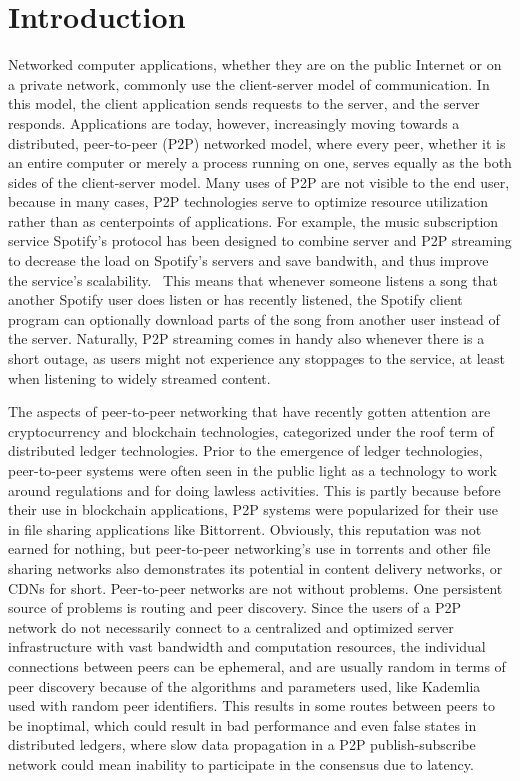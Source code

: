 \chapter{Introduction}
\label{Introduction}

Networked computer applications, whether they are on the public Internet or on a private network, commonly use the client-server model of communication. In this model, the client application sends requests to the server, and the server responds. Applications are today, however, increasingly moving towards a distributed, peer-to-peer (P2P) networked model, where every peer, whether it is an entire computer or merely a process running on one, serves equally as the both sides of the client-server model. Many uses of P2P are not visible to the end user, because in many cases, P2P technologies serve to optimize resource utilization rather than as centerpoints of applications. For example, the music subscription service Spotify's protocol has been designed to combine server and P2P streaming to decrease the load on Spotify's servers and save bandwith, and thus improve the service's scalability.~\cite{Kreitz_undated-yp} This means that whenever someone listens a song that another Spotify user does listen or has recently listened, the Spotify client program can optionally download parts of the song from another user instead of the server. Naturally, P2P streaming comes in handy also whenever there is a short outage, as users might not experience any stoppages to the service, at least when listening to widely streamed content.

The aspects of peer-to-peer networking that have recently gotten attention are cryptocurrency and blockchain technologies, categorized under the roof term of distributed ledger technologies. Prior to the emergence of ledger technologies, peer-to-peer systems were often seen in the public light as a technology to work around regulations and for doing lawless activities. This is partly because before their use in blockchain applications, P2P systems were popularized for their use in file sharing applications like Bittorrent. Obviously, this reputation was not earned for nothing, but peer-to-peer networking's use in torrents and other file sharing networks also demonstrates its potential in content delivery networks, or CDNs for short. Peer-to-peer networks are not without problems. One persistent source of problems is routing and peer discovery. Since the users of a P2P network do not necessarily connect to a centralized and optimized server infrastructure with vast bandwidth and computation resources, the individual connections between peers can be ephemeral, and are usually random in terms of peer discovery because of the algorithms and parameters used, like Kademlia used with random peer identifiers. This results in some routes between peers to be inoptimal, which could result in bad performance and even false states in distributed ledgers, where slow data propagation in a P2P publish-subscribe network could mean inability to participate in the consensus due to latency.

